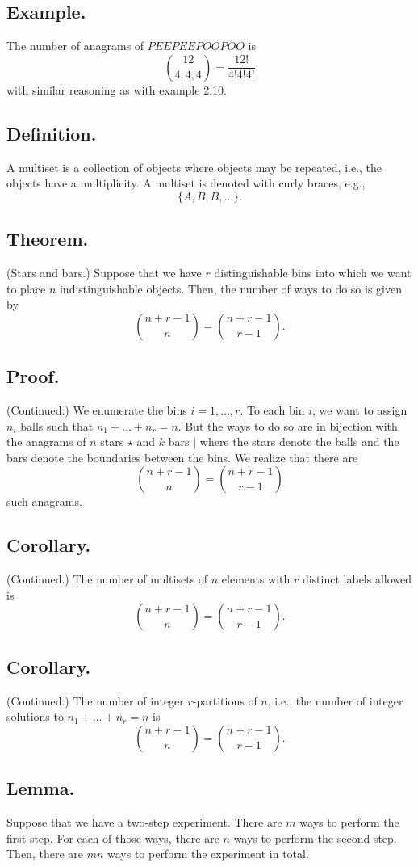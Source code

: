 \documentclass[titlepage]{article}
\begin{document}
\subsection{Example.} The number of anagrams of $PEEPEEPOOPOO$ is 
$$\binom{12}{4,4,4} = \frac{12!}{4!4!4!}$$
with similar reasoning as with example 2.10.

\subsection{Definition.} A multiset is a collection of objects where objects may be repeated, i.e., the objects have a multiplicity. A multiset is denoted with curly braces, e.g.,  
$$\{A, B, B, \ldots\}.$$

\subsection{Theorem.} (Stars and bars.) Suppose that we have $r$ distinguishable bins into which we want to place $n$ indistinguishable objects. Then, the number of ways to do so is given by 
$$\binom{n+r-1}{n} = \binom{n+r-1}{r-1}.$$

\subsection{Proof.} (Continued.) We enumerate the bins $i = 1, \ldots, r$. To each bin $i$, we want to assign $n_{i}$ balls such that $n_{1} + \ldots + n_{r} = n$. But the ways to do so are in bijection with the anagrams of $n$ stars $\star$ and $k$ bars $\vert$ where the stars denote the balls and the bars denote the boundaries between the bins. We realize that there are 
$$\binom{n+r-1}{n} = \binom{n+r-1}{r-1}$$
such anagrams.

\subsection{Corollary.} (Continued.) The number of multisets of $n$ elements with $r$ distinct labels allowed is 
$$\binom{n+r-1}{n} = \binom{n+r-1}{r-1}.$$

\subsection{Corollary.} (Continued.) The number of integer $r$-partitions of $n$, i.e., the number of integer solutions to $n_{1} + \ldots + n_{r} = n$ is 
$$\binom{n+r-1}{n} = \binom{n+r-1}{r-1}.$$

\subsection{Lemma.} Suppose that we have a two-step experiment. There are $m$ ways to perform the first step. For each of those ways, there are $n$ ways to perform the second step. Then, there are $mn$ ways to perform the experiment in total.
\end{document}
